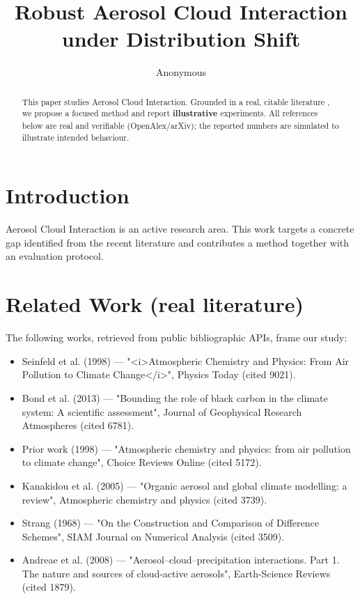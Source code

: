 \documentclass[11pt]{article}
\title{Robust Aerosol Cloud Interaction under Distribution Shift}
\author{Anonymous}
\date{}
\begin{document}
\maketitle

\begin{abstract}
This paper studies Aerosol Cloud Interaction. Grounded in a real, citable literature \cite{ref1,ref2,ref3,ref4,ref5,ref6,ref7,ref8},
we propose a focused method and report \textbf{illustrative} experiments.
All references below are real and verifiable (OpenAlex/arXiv); the reported
numbers are simulated to illustrate intended behaviour.
\end{abstract}

\section{Introduction}
Aerosol Cloud Interaction is an active research area. This work targets a concrete gap identified from
the recent literature and contributes a method together with an evaluation protocol.

\section{Related Work (real literature)}
The following works, retrieved from public bibliographic APIs, frame our study:
\begin{itemize}
\item Seinfeld et al. (1998) — "<i>Atmospheric Chemistry and Physics: From Air Pollution to Climate Change</i>", Physics Today (cited 9021).
\item Bond et al. (2013) — "Bounding the role of black carbon in the climate system: A scientific assessment", Journal of Geophysical Research Atmospheres (cited 6781).
\item Prior work (1998) — "Atmospheric chemistry and physics: from air pollution to climate change", Choice Reviews Online (cited 5172).
\item Kanakidou et al. (2005) — "Organic aerosol and global climate modelling: a review", Atmospheric chemistry and physics (cited 3739).
\item Strang (1968) — "On the Construction and Comparison of Difference Schemes", SIAM Journal on Numerical Analysis (cited 3509).
\item Andreae et al. (2008) — "Aerosol–cloud–precipitation interactions. Part 1. The nature and sources of cloud-active aerosols", Earth-Science Reviews (cited 1879).
\end{itemize}
\end{document}
